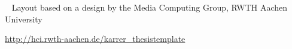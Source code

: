 
~
\vfill
Layout based on a design by the Media Computing Group, RWTH Aachen University

 \url{http://hci.rwth-aachen.de/karrer_thesistemplate}

